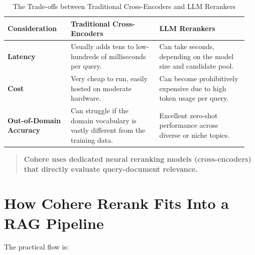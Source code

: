 \documentclass[12pt, a4paper]{article}
\begin{document}
\begin{table}[htbp]
\centering
\renewcommand{\arraystretch}{1.5}
\begin{tabular}{@{}p{0.25\linewidth}p{0.35\linewidth}p{0.35\linewidth}@{}}
\toprule
\textbf{Consideration} & \textbf{Traditional Cross-Encoders} & \textbf{LLM Rerankers} \\ 
\midrule
\textbf{Latency} & Usually adds tens to low-hundreds of milliseconds per query. & Can take seconds, depending on the model size and candidate pool. \\
\textbf{Cost} & Very cheap to run, easily hosted on moderate hardware. & Can become prohibitively expensive due to high token usage per query. \\
\textbf{Out-of-Domain Accuracy} & Can struggle if the domain vocabulary is vastly different from the training data. & Excellent zero-shot performance across diverse or niche topics. \\
\bottomrule
\end{tabular}
\caption{The Trade-offs between Traditional Cross-Encoders and LLM Rerankers}
\label{tab:tradeoffs}
\end{table}


\begin{quote}
\textbf{Cohere uses dedicated neural reranking models (cross-encoders) that directly evaluate query-document relevance.}
\end{quote}

\section{How Cohere Rerank Fits Into a RAG Pipeline}

The practical flow is:
\\
\end{document}
